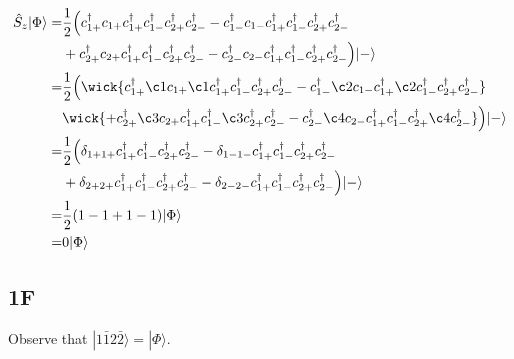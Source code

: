 \documentclass[norsk,a4paper,12pt]{article}
\begin{document}
\begin{align}
\hat{S}_z|\Phi\rangle=&\frac{1}{2}\Big(c_{1+}^{\dagger}c_{1+}c_{1+}^{\dagger}c_{1-}^{\dagger}c_{2+}^{\dagger}c_{2-}^{\dagger}-c_{1-}^{\dagger}c_{1-}c_{1+}^{\dagger}c_{1-}^{\dagger}c_{2+}^{\dagger}c_{2-}^{\dagger}\notag\\
&+c_{2+}^{\dagger}c_{2+}c_{1+}^{\dagger}c_{1-}^{\dagger}c_{2+}^{\dagger}c_{2-}^{\dagger}-c_{2-}^{\dagger}c_{2-}c_{1+}^{\dagger}c_{1-}^{\dagger}c_{2+}^{\dagger}c_{2-}^{\dagger}\Big)|-\rangle\\
=&\frac{1}{2}\Big(\wick{c_{1+}^{\dagger}\c1 c_{1+}\c1 c_{1+}^{\dagger}c_{1-}^{\dagger}c_{2+}^{\dagger}c_{2-}^{\dagger}-c_{1-}^{\dagger}\c2 c_{1-}c_{1+}^{\dagger}\c2 c_{1-}^{\dagger}c_{2+}^{\dagger}c_{2-}^{\dagger}}\notag\\
&\wick{+c_{2+}^{\dagger}\c3 c_{2+}c_{1+}^{\dagger}c_{1-}^{\dagger}\c3 c_{2+}^{\dagger}c_{2-}^{\dagger}-c_{2-}^{\dagger}\c4 c_{2-}c_{1+}^{\dagger}c_{1-}^{\dagger}c_{2+}^{\dagger}\c4 c_{2-}^{\dagger}}\Big)|-\rangle\\
=&\frac{1}{2}\Big(\delta_{1+1+}c_{1+}^{\dagger}c_{1-}^{\dagger}c_{2+}^{\dagger}c_{2-}^{\dagger}-\delta_{1-1-}c_{1+}^{\dagger}c_{1-}^{\dagger}c_{2+}^{\dagger}c_{2-}^{\dagger}\notag\\\
&+\delta_{2+2+}c_{1+}^{\dagger}c_{1-}^{\dagger}c_{2+}^{\dagger}c_{2-}^{\dagger}-\delta_{2-2-}c_{1+}^{\dagger}c_{1-}^{\dagger}c_{2+}^{\dagger}c_{2-}^{\dagger}\Big)|-\rangle\\
=&\frac{1}{2}(1-1+1-1)|\Phi\rangle\\
=&0|\Phi\rangle
\end{align}

\subsection*{1F}
Observe that $|1\bar{1}2\bar{2}\rangle=|\Phi\rangle$.
\end{document}
